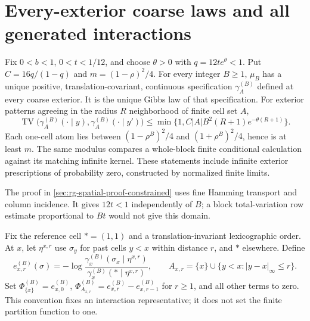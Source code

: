 \section{Every-exterior coarse laws and all generated interactions}
\label{sec:rg-spatial-generated}

Fix \(0<b<1\), \(0<t<1/12\), and choose \(\theta>0\) with
\(q=12t e^\theta<1\). Put \(C=16q/(1-q)\) and
\(m=(1-\rho)^2/4\). For every integer \(B\ge1\), \(\mu_B\) has a unique
positive, translation-covariant, continuous specification
\(\gamma^{(B)}_A\) defined at every coarse exterior. It is the unique Gibbs
law of that specification. For exterior patterns agreeing in the radius
\(R\) neighborhood of finite cell set \(A\),
\begin{equation}
 \operatorname{TV}\bigl(\gamma_A^{(B)}(\cdot\mid y),
                       \gamma_A^{(B)}(\cdot\mid y')\bigr)
 \le\min\{1,C|A|B^2(R+1)e^{-\theta(R+1)}\}.
 \label{eq:rg-spatial-coarse-modulus}
\end{equation}
Each one-cell atom lies between \((1-\rho^B)^2/4\) and
\((1+\rho^B)^2/4\), hence is at least \(m\). The same modulus compares a
whole-block finite conditional calculation against its matching infinite
kernel. These statements include infinite exterior prescriptions of
probability zero, constructed by normalized finite limits.

The proof in \cref{sec:rg-spatial-proof-constrained} uses fine Hamming
transport and column incidence. It gives \(12t<1\) independently of \(B\);
a block total-variation row estimate proportional to \(Bt\) would not give
this domain. 

Fix the reference cell \(*=(1,1)\) and a translation-invariant lexicographic
order. At \(x\), let \(\eta^{x,r}\) use \(\sigma_y\) for past cells
\(y<x\) within distance \(r\), and \(*\) elsewhere. Define
\begin{equation}
 e_{x,r}^{(B)}(\sigma)=-\log
 \frac{\gamma_x^{(B)}(\sigma_x\mid\eta^{x,r})}
      {\gamma_x^{(B)}(*\mid\eta^{x,r})},\qquad
 A_{x,r}=\{x\}\cup\{y<x:|y-x|_\infty\le r\}.
 \label{eq:rg-spatial-vacuum-odds}
\end{equation}
Set \(\Phi^{(B)}_{\{x\}}=e_{x,0}^{(B)}\),
\(\Phi^{(B)}_{A_{x,r}}=e_{x,r}^{(B)}-e_{x,r-1}^{(B)}\) for \(r\ge1\),
and all other terms to zero. This convention fixes an interaction
representative; it does not set the finite partition function to one.

